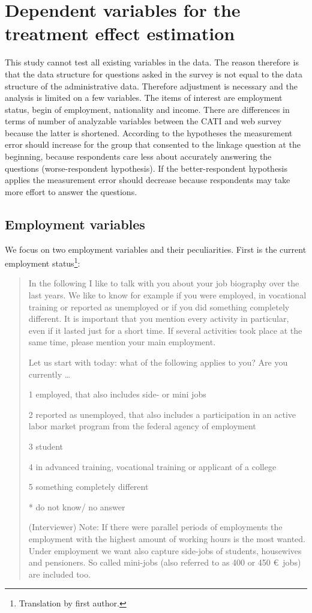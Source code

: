 \section{Dependent variables for the treatment effect estimation}\label{variables}

This study cannot test all existing variables in the data. The reason therefore is that the data structure for questions asked in the survey is not equal to the data structure of the administrative data. Therefore adjustment is necessary and the analysis is limited on a few variables. The items of interest are employment status, begin of employment, nationality and income. There are differences in terms of number of analyzable variables between the CATI and web survey because the latter is shortened. According to the hypotheses the measurement error should increase for the group that consented to the linkage question at the beginning, because respondents care less about accurately answering the questions (worse-respondent hypothesis). If the better-respondent hypothesis applies the measurement error should decrease because respondents may take more effort to answer the questions.

\subsection{Employment variables}

We focus on two employment variables and their peculiarities. First is the current employment status\footnote{Translation by first author.}:

\begin{quote}
\begin {small}
In the following I like to talk with you about your job biography over the last years. We like to know for example if you were employed, in vocational training or reported as unemployed or if you did something completely different. It is important that you mention every activity in particular, even if it lasted just for a short time. If several activities took place at the same time, please mention your main employment.

Let us start with today: what of the following applies to you? Are you currently \ldots

1 employed, that also includes side- or mini jobs

2 reported as unemployed, that also includes a participation in an active labor market program from the federal agency of employment

3 student

4 in advanced training, vocational training or applicant of a college

5 something completely different

* do not know/ no answer

(Interviewer) Note: If there were parallel periods of employments the employment with the highest amount of working hours is the most wanted. Under employment we want also capture side-jobs of students, housewives and pensioners. So called mini-jobs (also referred to as 400 or 450 \euro \ jobs) are included too.
\end{small}
\end{quote}


